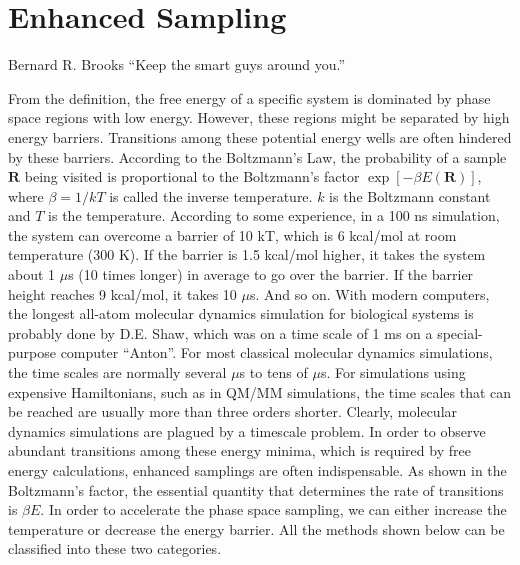 \chapter{Enhanced Sampling\label{chapter:ES}}
\begin{chapquote}{Bernard R. Brooks%
	}
	``Keep the smart guys around you.''
\end{chapquote}
From the definition, the free energy of a specific system is dominated by phase space regions with low energy. However, these regions might be separated by high energy barriers. Transitions among these potential energy wells are often hindered by these barriers. According to the Boltzmann's Law, the probability of a sample $\mathbf{R}$ being visited is proportional to the Boltzmann's factor $\exp{\left[-\beta E(\mathbf{R})\right]}$, where $\beta=1/kT$ is called the inverse temperature. $k$ is the Boltzmann constant and $T$ is the temperature. According to some experience, in a 100 ns simulation, the system can overcome a barrier of 10 kT, which is 6 kcal/mol at room temperature (300 K). If the barrier is 1.5 kcal/mol higher, it takes the system about 1 $\mu$s (10 times longer) in average to go over the barrier. If the barrier height reaches 9 kcal/mol, it takes 10 $\mu$s. And so on. With modern computers, the longest all-atom molecular dynamics simulation for biological systems is probably done by D.E. Shaw, which was on a time scale of 1 ms on a special-purpose computer ``Anton''. For most classical molecular dynamics simulations, the time scales are normally several $\mu$s to tens of $\mu$s. For simulations using expensive Hamiltonians, such as in QM/MM simulations, the time scales that can be reached are usually more than three orders shorter. Clearly, molecular dynamics simulations are plagued by a timescale problem. In order to observe abundant transitions among these energy minima, which is required by free energy calculations, enhanced samplings are often indispensable. As shown in the Boltzmann's factor, the essential quantity that determines the rate of transitions is $\beta E$. In order to accelerate the phase space sampling, we can either increase the temperature or decrease the energy barrier. All the methods shown below can be classified into these two categories. 
\clearpage 

\clearpage 

\clearpage

\clearpage 

\clearpage 

\clearpage 

\clearpage

%
